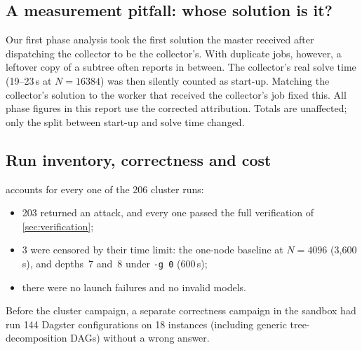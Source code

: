 \documentclass[11pt,a4paper]{article}
\newcommand{\opt}[1]{\texttt{#1}}
\begin{document}
\subsection{A measurement pitfall: whose solution is it?}
\label{sec:pitfall}
Our first phase analysis took the first solution the master received after dispatching the
collector to be the collector's. With duplicate jobs, however, a leftover copy of a
subtree often reports in between. The collector's real solve time (19--23\,s at
$N=16384$) was then silently counted as start-up. Matching the collector's solution to the
worker that received the collector's job fixed this. All phase figures in this report use
the corrected attribution. Totals are unaffected; only the split between start-up and
solve time changed.

\subsection{Run inventory, correctness and cost}
\label{sec:correctness}
 accounts for every one of the 206 cluster runs:
\begin{itemize}
\item 203 returned an attack, and every one passed the full verification of
      \cref{sec:verification};
\item 3 were censored by their time limit: the one-node baseline at $N=4096$ (3{,}600\,s),
      and depths~7 and~8 under \opt{-g 0} (600\,s);
\item there were no launch failures and no invalid models.
\end{itemize}
Before the cluster campaign, a separate correctness campaign in the sandbox had run 144 Dagster
configurations on 18 instances (including generic tree-decomposition DAGs) without a wrong
answer.
\end{document}
